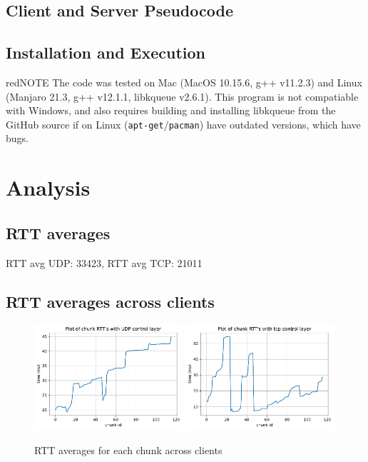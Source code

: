 \documentclass[12pt]{article}
\begin{document}
\subsection{Client and Server Pseudocode}



\subsection{Installation and Execution}

\begin{mybox}{red}{NOTE}
The code was tested on Mac (MacOS 10.15.6, g++ v11.2.3) and Linux (Manjaro 21.3, g++ v12.1.1, libkqueue v2.6.1). This program is not compatiable with Windows, and also requires building and installing libkqueue from the GitHub source if on Linux (\texttt{apt-get}/\texttt{pacman}) have outdated versions, which have bugs.
\end{mybox}


\section{Analysis}

\subsection{RTT averages}

RTT avg UDP: 33423, RTT avg TCP: 21011

\subsection{RTT averages across clients}

\begin{figure}[H]
  \centering
  \includegraphics[width=0.49\textwidth]{udp_plot.pdf}
  \includegraphics[width=0.49\textwidth]{tcp_plot.pdf}
  \caption{RTT averages for each chunk across clients}
\end{figure}
\end{document}
